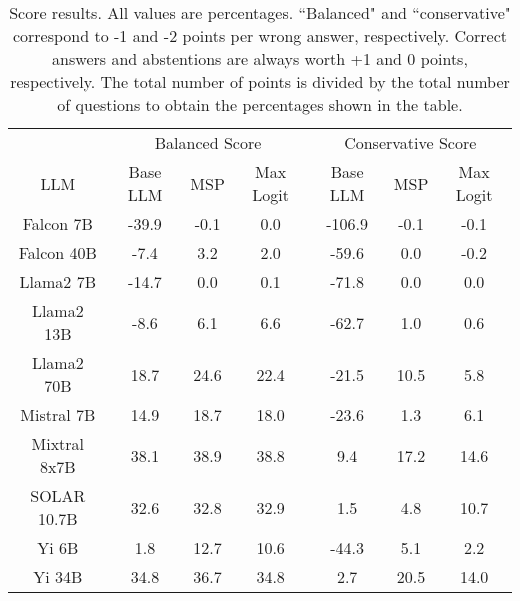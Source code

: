 \begin{table*}
\centering
\begin{tabular}{c|c|c|c|c|c|c}
& \multicolumn{3}{c|}{Balanced Score} & \multicolumn{3}{c}{Conservative Score} \\ 
LLM & Base LLM & MSP & Max Logit & Base LLM & MSP & Max Logit\\ \hline
Falcon 7B & -39.9 & -0.1 & 0.0 & -106.9 & -0.1 & -0.1\\
Falcon 40B & -7.4 & 3.2 & 2.0 & -59.6 & 0.0 & -0.2\\
Llama2 7B & -14.7 & 0.0 & 0.1 & -71.8 & 0.0 & 0.0\\
Llama2 13B & -8.6 & 6.1 & 6.6 & -62.7 & 1.0 & 0.6\\
Llama2 70B & 18.7 & 24.6 & 22.4 & -21.5 & 10.5 & 5.8\\
Mistral 7B & 14.9 & 18.7 & 18.0 & -23.6 & 1.3 & 6.1\\
Mixtral 8x7B & 38.1 & 38.9 & 38.8 & 9.4 & 17.2 & 14.6\\
SOLAR 10.7B & 32.6 & 32.8 & 32.9 & 1.5 & 4.8 & 10.7\\
Yi 6B & 1.8 & 12.7 & 10.6 & -44.3 & 5.1 & 2.2\\
Yi 34B & 34.8 & 36.7 & 34.8 & 2.7 & 20.5 & 14.0\\
\hline
\end{tabular}
\caption{Score results. All values are percentages. ``Balanced" and ``conservative" correspond to -1 and -2 points per wrong answer, respectively. Correct answers and abstentions are always worth +1 and 0 points, respectively. The total number of points is divided by the total number of questions to obtain the percentages shown in the table.}
\label{tab:score}
\end{table*}
